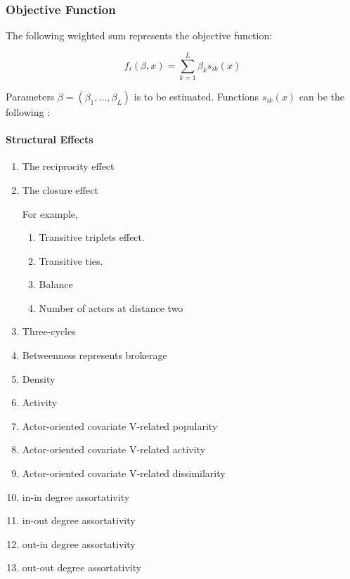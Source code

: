 \documentclass[11pt]{report}
\begin{document}
\subsubsection{Objective Function}
The following weighted sum represents the objective function:

\begin{equation}
f_i(\beta, x) = \sum_{k = 1}^{L} \beta_k s_{ik}(x)
\end{equation}

Parameters $\beta = (\beta_1, ..., \beta_L)$ is to be estimated. Functions $s_{ik}(x)$ can be the following \cite{Snijders2004}:

\paragraph{Structural Effects}
\begin{enumerate}
\item{The reciprocity effect}
\item{The closure effect}

For example, 
\begin{enumerate}
\item Transitive triplets effect. 
\item Transitive ties.
\item Balance
\item Number of actors at distance two
\end{enumerate}
\item{Three-cycles}
\item{Betweenness}
represents brokerage
\item{Density}
\item{Activity}
\item{Actor-oriented covariate V-related popularity}
\item{Actor-oriented covariate V-related activity}
\item{Actor-oriented covariate V-related dissimilarity}
\item{in-in degree assortativity}
\item{in-out degree assortativity}
\item{out-in degree assortativity}
\item{out-out degree assortativity}
\end{enumerate}
\end{document}
